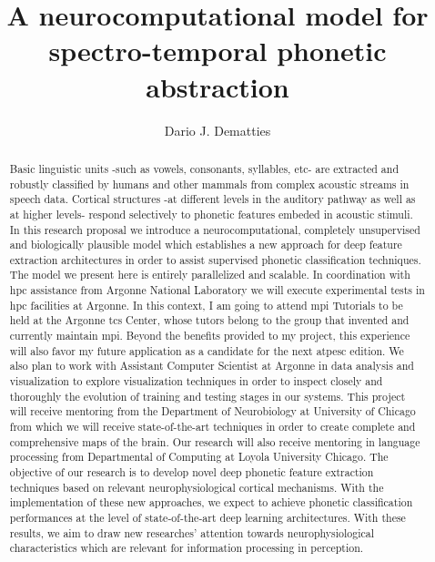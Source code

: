 \documentclass[11pt,a4paper]{article}
\title{A neurocomputational model for spectro-temporal phonetic abstraction}
\author[1]{Dario J. Dematties}
\affil[1]{Instituto de Ingeniería Biomédica, Facultad de Ingeniería, Universidad de Buenos Aires,
Ciudad Autonoma de Buenos Aires, Buenos Aires, Argentina}
\begin{document}
\linenumbers


\maketitle

\begin{abstract}
Basic linguistic units -such as vowels, consonants, syllables, etc-
are extracted and robustly classified by humans and other mammals
from complex acoustic streams in speech data.
Cortical structures -at different levels in the auditory pathway as well as at higher levels-
respond selectively to phonetic features embeded in acoustic stimuli.
In this research proposal we introduce a neurocomputational,
completely unsupervised and biologically plausible model
which establishes a new approach for deep feature extraction
architectures in order to assist supervised phonetic classification
techniques.
The model we present here is entirely parallelized and scalable.
In coordination with \gls{hpc} assistance from Argonne National Laboratory
we will execute experimental tests in \gls{hpc} facilities at Argonne.
In this context, I am going to attend \gls{mpi} Tutorials to be held at
the Argonne \gls{tcs} Center, whose tutors belong to the group
that invented and currently maintain \gls{mpi}.
Beyond the benefits provided to my project,
this experience will also favor my future application as a candidate
for the next \gls{atpesc} edition. 
We also plan to work with Assistant Computer Scientist at Argonne
in data analysis and visualization to explore visualization techniques
in order to inspect closely and thoroughly the evolution of
training and testing stages
in our systems.
This project will receive mentoring from the Department of Neurobiology at
University of Chicago from which we will receive state-of-the-art
techniques in order to create complete and comprehensive maps of the brain.
Our research will also receive mentoring in language processing
from Departmental of Computing at
Loyola University Chicago.
The objective of our research is to develop novel deep phonetic
feature extraction techniques based on relevant neurophysiological
cortical mechanisms.
With the implementation of these new approaches, we expect to
achieve phonetic classification performances at the level of state-of-the-art deep learning architectures. 
With these results, we aim to draw new researches' attention 
towards neurophysiological characteristics which are
relevant for information processing in perception.
\end{abstract}
\end{document}
